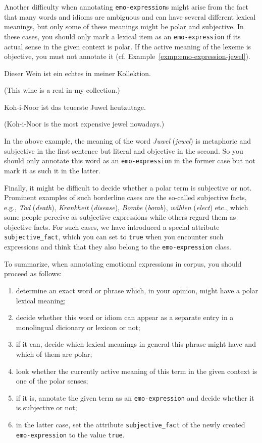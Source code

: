Another difficulty when annotating \texttt{emo-expression}s might
arise from the fact that many words and idioms are ambiguous and can
have several different lexical meanings, but only some of these
meanings might be polar and subjective.  In these cases, you should
only mark a lexical item as an \texttt{emo-expression} if its actual
sense in the given context is polar.  If the active meaning of the
lexeme is objective, you must not annotate it
(cf. Example~\ref{exmp:emo-expression-jewel}).
\begin{example}
  Dieser Wein ist ein echtes  in meiner
  Kollektion.

  (This wine is a real  in my collection.)

  Koh-i-Noor ist das teuerste Juwel heutzutage.

  (Koh-i-Noor is the most expensive jewel nowadays.)\label{exmp:emo-expression-jewel}
\end{example}
\noindent{}In the above example, the meaning of the word
\textit{Juwel} (\textit{jewel}) is metaphoric and subjective in the
first sentence but literal and objective in the second.  So you should
only annotate this word as an \texttt{emo-expression} in the former
case but not mark it as such it in the latter.

Finally, it might be difficult to decide whether a polar term is
subjective or not.  Prominent examples of such borderline cases are
the so-called subjective facts, e.g., \emph{Tod} (\emph{death}),
\emph{Krankheit} (\emph{disease}), \emph{Bombe} (\emph{bomb}),
\emph{w\"ahlen} (\emph{elect}) etc., which some people perceive as
subjective expressions while others regard them as objective facts.
For such cases, we have introduced a special attribute
\texttt{subjective\_fact}, which you can set to \texttt{true} when you
encounter such expressions and think that they also belong to the
\texttt{emo-expression} class.

To summarize, when annotating emotional expressions in corpus, you
should proceed as follows:
\begin{enumerate}
  \item determine an exact word or phrase which, in your opinion,
    might have a polar lexical meaning;
  \item decide whether this word or idiom can appear as a separate
    entry in a monolingual dicionary or lexicon or not;
  \item if it can, decide which lexical meanings in general this
    phrase might have and which of them are polar;
  \item look whether the currently active meaning of this term in the
    given context is one of the polar senses;
  \item if it is, annotate the given term as an
    \texttt{emo-expression} and decide whether it is subjective or
    not;
  \item in the latter case, set the attribute \texttt{subjective\_fact}
    of the newly created \texttt{emo-expression} to the value
    \texttt{true}.
\end{enumerate}

